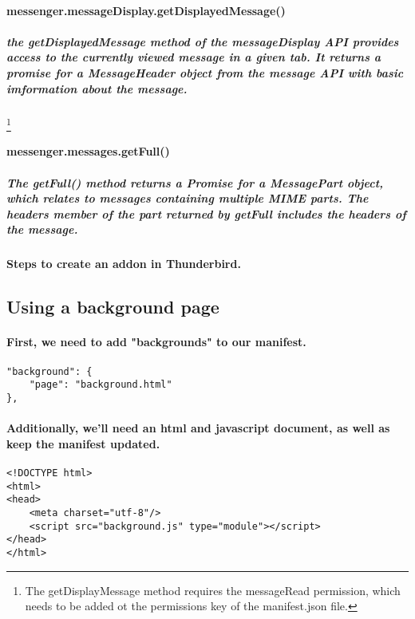 \paragraph{messenger.messageDisplay.getDisplayedMessage()}
\subparagraph{the \emph{getDisplayedMessage} method of the \emph{messageDisplay API} provides access to the currently viewed message in a given tab. It returns a promise for a \emph{MessageHeader} object from the \emph{message API} with basic imformation about the message.}\footnote{The getDisplayMessage method requires the messageRead permission, which needs to be added ot the permissions key of the manifest.json file.}

\paragraph{messenger.messages.getFull()}
\subparagraph{The \emph{getFull()} method returns a Promise for a MessagePart object, which relates to messages containing multiple MIME parts. The headers member of the part returned by getFull includes the headers of the message.}

\paragraph{Steps to create an addon in Thunderbird.}

\subsection{Using a background page}
\paragraph{First, we need to add "backgrounds" to our manifest.}

\begin{center}
\begin{verbatim}
"background": {
    "page": "background.html"
},
\end{verbatim}
\end{center}

\paragraph{Additionally, we'll need an html and javascript document, as well as keep the manifest updated.}

\begin{center}
\begin{verbatim}
<!DOCTYPE html>
<html>
<head>
    <meta charset="utf-8"/>
    <script src="background.js" type="module"></script>
</head>
</html>
\end{verbatim}
\end{center}


